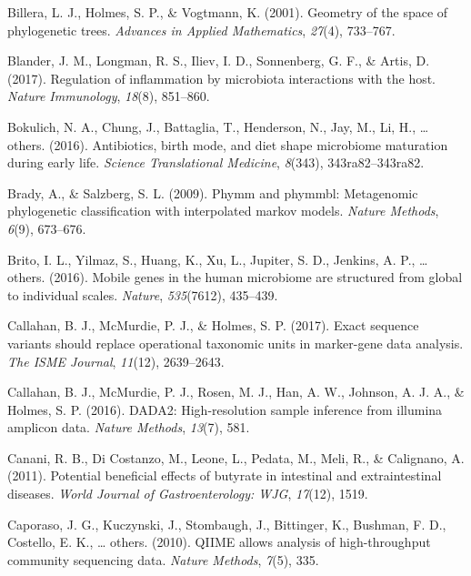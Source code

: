 \documentclass[12pt,a4paper]{reedthesis}
\theoremstyle{definition}
\theoremstyle{definition}
\theoremstyle{definition}
\theoremstyle{remark}
\begin{document}
\leavevmode\hypertarget{ref-billera2001geometry}{}%
Billera, L. J., Holmes, S. P., \& Vogtmann, K. (2001). Geometry of the space of phylogenetic trees. \emph{Advances in Applied Mathematics}, \emph{27}(4), 733--767.

\leavevmode\hypertarget{ref-blander2017regulation}{}%
Blander, J. M., Longman, R. S., Iliev, I. D., Sonnenberg, G. F., \& Artis, D. (2017). Regulation of inflammation by microbiota interactions with the host. \emph{Nature Immunology}, \emph{18}(8), 851--860.

\leavevmode\hypertarget{ref-bokulich2016antibiotics}{}%
Bokulich, N. A., Chung, J., Battaglia, T., Henderson, N., Jay, M., Li, H., \ldots{} others. (2016). Antibiotics, birth mode, and diet shape microbiome maturation during early life. \emph{Science Translational Medicine}, \emph{8}(343), 343ra82--343ra82.

\leavevmode\hypertarget{ref-brady2009phymm}{}%
Brady, A., \& Salzberg, S. L. (2009). Phymm and phymmbl: Metagenomic phylogenetic classification with interpolated markov models. \emph{Nature Methods}, \emph{6}(9), 673--676.

\leavevmode\hypertarget{ref-brito2016mobile}{}%
Brito, I. L., Yilmaz, S., Huang, K., Xu, L., Jupiter, S. D., Jenkins, A. P., \ldots{} others. (2016). Mobile genes in the human microbiome are structured from global to individual scales. \emph{Nature}, \emph{535}(7612), 435--439.

\leavevmode\hypertarget{ref-callahan2017exact}{}%
Callahan, B. J., McMurdie, P. J., \& Holmes, S. P. (2017). Exact sequence variants should replace operational taxonomic units in marker-gene data analysis. \emph{The ISME Journal}, \emph{11}(12), 2639--2643.

\leavevmode\hypertarget{ref-callahan2016dada2}{}%
Callahan, B. J., McMurdie, P. J., Rosen, M. J., Han, A. W., Johnson, A. J. A., \& Holmes, S. P. (2016). DADA2: High-resolution sample inference from illumina amplicon data. \emph{Nature Methods}, \emph{13}(7), 581.

\leavevmode\hypertarget{ref-canani2011potential}{}%
Canani, R. B., Di Costanzo, M., Leone, L., Pedata, M., Meli, R., \& Calignano, A. (2011). Potential beneficial effects of butyrate in intestinal and extraintestinal diseases. \emph{World Journal of Gastroenterology: WJG}, \emph{17}(12), 1519.

\leavevmode\hypertarget{ref-caporaso2010qiime}{}%
Caporaso, J. G., Kuczynski, J., Stombaugh, J., Bittinger, K., Bushman, F. D., Costello, E. K., \ldots{} others. (2010). QIIME allows analysis of high-throughput community sequencing data. \emph{Nature Methods}, \emph{7}(5), 335.
\end{document}
